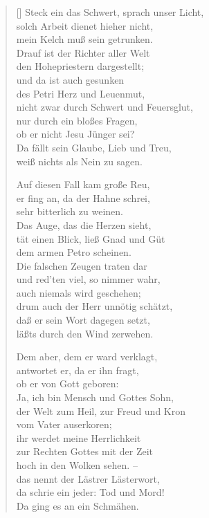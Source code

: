 \begin{multicols}{2}
\begin{verse}[\versewidth]
 Steck ein das Schwert, sprach unser Licht,\\
solch Arbeit dienet hieher nicht,\\
mein Kelch muß sein getrunken.\\
Drauf ist der Richter aller Welt\\
den Hohepriestern dargestellt;\\
und da ist auch gesunken\\
des Petri Herz und Leuenmut,\\
nicht zwar durch Schwert und Feuersglut,\\
nur durch ein bloßes Fragen,\\
ob er nicht Jesu Jünger sei?\\
Da fällt sein Glaube, Lieb und Treu,\\
weiß nichts als Nein zu sagen.

 Auf diesen Fall kam große Reu,\\
er fing an, da der Hahne schrei,\\
sehr bitterlich zu weinen.\\
Das Auge, das die Herzen sieht,\\
tät einen Blick, ließ Gnad und Güt\\
dem armen Petro scheinen.\\
Die falschen Zeugen traten dar\\
und red'ten viel, so nimmer wahr,\\
auch niemals wird geschehen;\\
drum auch der Herr unnötig schätzt,\\
daß er sein Wort dagegen setzt,\\
läßts durch den Wind zerwehen.

 Dem aber, dem er ward verklagt,\\
antwortet er, da er ihn fragt,\\
ob er von Gott geboren:\\
Ja, ich bin Mensch und Gottes Sohn,\\
der Welt zum Heil, zur Freud und Kron\\
vom Vater auserkoren;\\
ihr werdet meine Herrlichkeit\\
zur Rechten Gottes mit der Zeit\\
hoch in den Wolken sehen. –\\
das nennt der Lästrer Lästerwort,\\
da schrie ein jeder: Tod und Mord!\\
Da ging es an ein Schmähen.


\end{verse}
\end{multicols}
